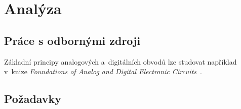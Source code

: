 
\chapter{Analýza}
\label{chap:analyza}

\section{Práce s odbornými zdroji}

Základní principy analogových a~digitálních obvodů lze studovat například
v~knize \emph{Foundations of Analog and Digital Electronic Circuits}~\cite{agarwal2005}.


\section{Požadavky}
\label{sec:pozadavky}

